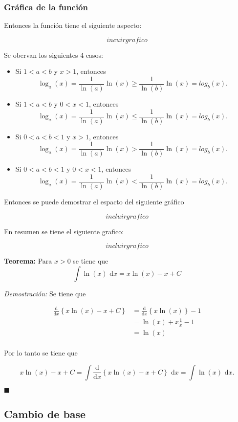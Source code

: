 \documentclass[pts12]{article}
\numberwithin{equation}{section}
\newcommand{\Col}{\color{ProcessBlue}}
\newcommand{\der}[1]{\frac{\mathrm{d}}{\mathrm{d}#1}}
\begin{document}
\subsubsection{Gráfica de la función}

Entonces la función tiene el siguiente aspecto:

$$incuir grafico$$

Se obervan los siguientes 4 casos:
\begin{itemize}
\item Si $1<a<b$ y $x>1$, entonces $$\log_a(x)=\frac{1}{\ln(a)}\ln(x)\geq \frac{1}{\ln(b)}\ln(x)=log_b(x).$$
\item Si $1<a<b$ y $0<x<1$, entonces $$\log_a(x)=\frac{1}{\ln(a)}\ln(x)\leq \frac{1}{\ln(b)}\ln(x)=log_b(x).$$
\item Si $0<a<b<1$ y $x>1$, entonces $$\log_a(x)=\frac{1}{\ln(a)}\ln(x)> \frac{1}{\ln(b)}\ln(x)=log_b(x).$$
\item Si $0<a<b<1$ y $0<x<1$, entonces $$\log_a(x)=\frac{1}{\ln(a)}\ln(x)< \frac{1}{\ln(b)}\ln(x)=log_b(x).$$    
\end{itemize}

Entonces se puede demostrar el espacto del siguiente gráfico

$$incluir grafico$$

En resumen se tiene el siguiente grafico:

$$incluir grafico$$

\textbf{Teorema:} Para $x>0$ se tiene que
$$ \int\!\ln(x)\mbox{ d}x=x\ln(x)-x+C $$

\textit{Demostración:} Se tiene que 

$$\begin{aligned}
    \der{x}\left\{x\ln(x)-x+C\right\} & = \der{x}\left\{x\ln(x)\right\} -1  \\
    & = \ln(x)+x\frac{1}{x}-1 \\ 
    & = \ln(x) \\ 
\end{aligned}$$

Por lo tanto se tiene que

$$x\ln(x)-x+C=\int\!\der{x}\left\{x\ln(x)-x+C\right\}\mbox{ d}x=\int\!\ln(x)\mbox{ d}x.$$

\begin{flushright}
    $\blacksquare$
\end{flushright}

\subsection{\Col Cambio de base}
\end{document}
